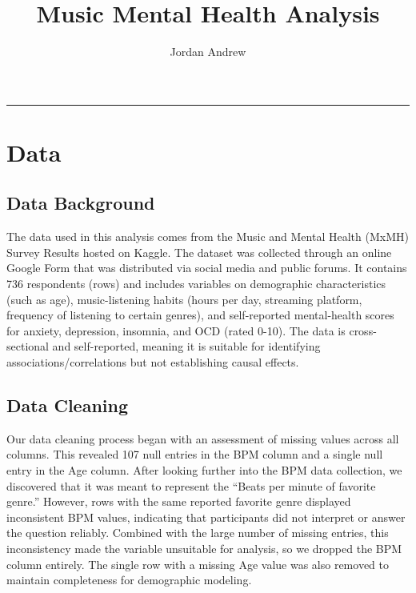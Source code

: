 \documentclass[
  letterpaper,
  DIV=11,
  numbers=noendperiod]{scrartcl}
\title{Music Mental Health Analysis}
\subtitle{Jordan Andrew}
\author{}
\date{}
\begin{document}
\maketitle


\begin{center}\rule{0.5\linewidth}{0.5pt}\end{center}

\section{Data}\label{data}

\subsection{Data Background}\label{data-background}

The data used in this analysis comes from the Music and Mental Health
(MxMH) Survey Results hosted on Kaggle. The dataset was collected
through an online Google Form that was distributed via social media and
public forums. It contains 736 respondents (rows) and includes variables
on demographic characteristics (such as age), music-listening habits
(hours per day, streaming platform, frequency of listening to certain
genres), and self-reported mental-health scores for anxiety, depression,
insomnia, and OCD (rated 0-10). The data is cross-sectional and
self-reported, meaning it is suitable for identifying
associations/correlations but not establishing causal effects.

\subsection{Data Cleaning}\label{data-cleaning}

Our data cleaning process began with an assessment of missing values
across all columns. This revealed 107 null entries in the BPM column and
a single null entry in the Age column. After looking further into the
BPM data collection, we discovered that it was meant to represent the
``Beats per minute of favorite genre.'' However, rows with the same
reported favorite genre displayed inconsistent BPM values, indicating
that participants did not interpret or answer the question reliably.
Combined with the large number of missing entries, this inconsistency
made the variable unsuitable for analysis, so we dropped the BPM column
entirely. The single row with a missing Age value was also removed to
maintain completeness for demographic modeling.
\end{document}
